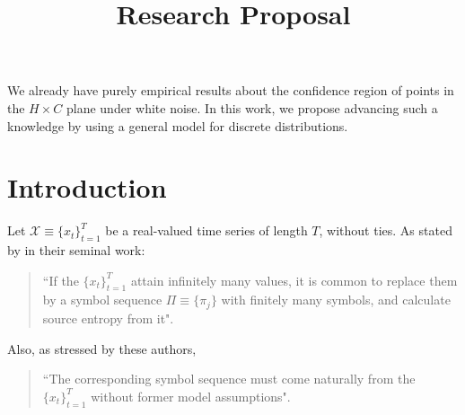 \documentclass[12pt]{article}
\title{Research Proposal}
\begin{document}
\maketitle
	
We already have purely empirical results about the confidence region of points in the $H\times C$ plane under white noise.
In this work, we propose advancing such a knowledge by using a general model for discrete distributions.

\section{Introduction}

Let ${\mathcal X} \equiv \{x_t\}_{t=1}^{T}$ be a real-valued time series of length $T$, without ties. 
As stated by \citet{PermutationEntropyBandtPompe} in their seminal work:  
\begin{quote}
	``If the $\{x_t\}_{t=1}^{T}$ attain infinitely many values, it is common to replace them by a symbol sequence 
	$\Pi \equiv \{\pi_j\}$ with finitely many symbols, and calculate source entropy from it".
\end{quote}
Also, as stressed by these authors, 
\begin{quote}
	``The corresponding symbol sequence must come 
	naturally from the $\{x_t\}_{t=1}^{T}$ without former model assumptions".
\end{quote}
\end{document}
